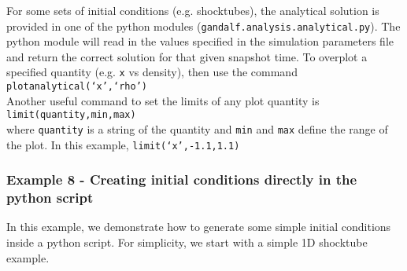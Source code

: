 \documentclass[a4paper]{article}
\newcommand{\var}[1]{\texttt{#1}}
\newcommand{\singlecommand}[1]{\\ \newline \indent \var{#1} \\ \newline \noindent}
\begin{document}
\noindent For some sets of initial conditions (e.g. shocktubes), the analytical solution is provided in one of the python modules (\var{gandalf.analysis.analytical.py}).  The python module will read in the values specified in the simulation parameters file and return the correct solution for that given snapshot time.  To overplot a specified quantity (e.g. \var{x} vs density), then use the command \singlecommand{plotanalytical(`x',`rho')}  Another useful command to set the limits of any plot quantity is \singlecommand{limit(quantity,min,max)} where \var{quantity} is a string of the quantity and \var{min} and \var{max} define the range of the plot.  In this example, \var{limit(`x',-1.1,1.1)}


\subsubsection{Example 8 - Creating initial conditions directly in the python script}
In this example, we demonstrate how to generate some simple initial conditions inside a python script.  For simplicity, we start with a simple 1D shocktube example. \\
\end{document}
